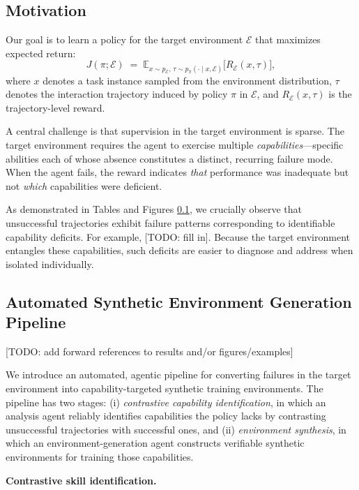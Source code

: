 \subsection{Motivation}

Our goal is to learn a policy for the target environment $\mathcal{E}$ that maximizes expected return:
\[
J(\pi;\mathcal{E})
\;=\;
\mathbb{E}_{x \sim p_{\mathcal{E}},\, \tau \sim p_{\pi}(\cdot \mid x,\mathcal{E})}
\bigl[ R_{\mathcal{E}}(x,\tau) \bigr],
\]
where $x$ denotes a task instance sampled from the environment distribution, $\tau$ denotes the interaction trajectory induced by policy $\pi$ in $\mathcal{E}$, and $R_{\mathcal{E}}(x,\tau)$ is the trajectory-level reward.

A central challenge is that supervision in the target environment is sparse. The target environment requires the agent to exercise multiple \emph{capabilities}---specific abilities each of whose absence constitutes a distinct, recurring failure mode. When the agent fails, the reward indicates \emph{that} performance was inadequate but not \emph{which} capabilities were deficient. 

As demonstrated in Tables and Figures \ref{}, we crucially observe that unsuccessful trajectories exhibit failure patterns corresponding to identifiable capability deficits. For example, [TODO: fill in]. Because the target environment entangles these capabilities, such deficits are easier to diagnose and address when isolated individually.



\subsection{Automated Synthetic Environment Generation Pipeline}
\label{sec:env_gen}

[TODO: add forward references to results and/or figures/examples]

We introduce an automated, agentic pipeline for converting failures in the target environment into capability-targeted synthetic training environments. The pipeline has two stages: (i) \emph{contrastive capability identification}, in which an analysis agent reliably identifies capabilities the policy lacks by contrasting unsuccessful trajectories with successful ones, and (ii) \emph{environment synthesis}, in which an environment-generation agent constructs verifiable synthetic environments for training those capabilities.

\noindent\textbf{Contrastive skill identification.}

